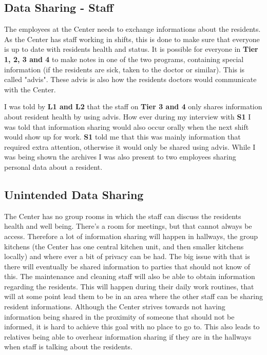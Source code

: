 \documentclass[11pt]{article}
\begin{document}
\subsection{Data Sharing - Staff}
The employees at the Center needs to exchange informations about the residents. As the Center has staff working in shifts, this is done to make sure that everyone is up to date with residents health and status. It is possible for everyone in \textbf{Tier 1, 2, 3 and 4} to make notes in one of the two programs, containing special information (if the residents are sick, taken to the doctor or similar). This is called "advis". These advis is also how the residents doctors would communicate with the Center.

I was told by \textbf{L1 and L2} that the staff on \textbf{Tier 3 and 4} only shares information about resident health by using advis. How ever during my interview with \textbf{S1} I was told that information sharing would also occur orally when the next shift would show up for work. \textbf{S1} told me that this was mainly information that required extra attention, otherwise it would only be shared using advis. While I was being shown the archives I was also present to two employees sharing personal data about a resident.

\subsection{Unintended Data Sharing}
The Center has no group rooms in which the staff can discuss the residents health and well being. There's a room for meetings, but that cannot always be access. Therefore a lot of information sharing will happen in hallways, the group kitchens (the Center has one central kitchen unit, and then smaller kitchens locally) and where ever a bit of privacy can be had. The big issue with that is there will eventually be shared information to parties that should not know of this. 
The maintenance and cleaning staff will also be able to obtain information regarding the residents. This will happen during their daily work routines, that will at some point lead them to be in an area where the other staff can be sharing resident informations.
Although the Center strives towards not having information being shared in the proximity of someone that should not be informed, it is hard to achieve this goal with no place to go to.
This also leads to relatives being able to overhear information sharing if they are in the hallways when staff is talking about the residents.
\end{document}
